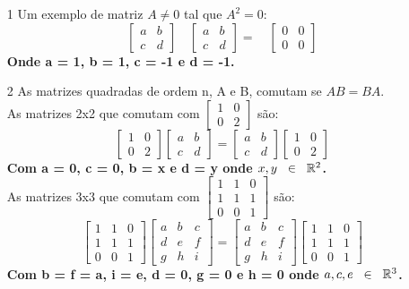 \documentclass[11pt]{article}
\begin{document}
\begin{itemize}
\item[1] Um exemplo de matriz $A \neq 0$ tal que $A^2=0$:
$$
\left[\begin{array}{rr}
a&b\\
c&d
\end{array}\right]
\quad
\left[\begin{array}{cc}
a&b\\
c&d
\end{array}\right]
=
\quad
\left[\begin{array}{cc}
0&0\\
0&0
\end{array}\right]
$$
\textbf{Onde a = 1, b = 1, c = -1 e d = -1.}
\item[2] As matrizes quadradas de ordem n, A e B, comutam se $AB = BA$. 
\\As matrizes 2x2 que comutam com $\left[\begin{array}{cc}
1&0\\0&2
\end{array}\right]$ são:
$$
\begin{bmatrix}
1&0\\0&2
\end{bmatrix}
\begin{bmatrix}
a&b\\c&d
\end{bmatrix}
=
\begin{bmatrix}
a&b\\c&d
\end{bmatrix}
\begin{bmatrix}
1&0\\0&2
\end{bmatrix}
$$
\textbf{Com a = 0, c = 0, b = x e d = y onde $x,y\hspace{2mm}\in\hspace{2mm}\mathbb{R}^2$.}
\\As matrizes 3x3 que comutam com 
$\begin{bmatrix}
1&1&0\\1&1&1\\0&0&1
\end{bmatrix}$ são:
$$
\begin{bmatrix}
1&1&0\\1&1&1\\0&0&1
\end{bmatrix}
\begin{bmatrix}
a&b&c\\d&e&f\\g&h&i
\end{bmatrix}
=
\begin{bmatrix}
a&b&c\\d&e&f\\g&h&i
\end{bmatrix}
\begin{bmatrix}
1&1&0\\1&1&1\\0&0&1
\end{bmatrix}
$$
\textbf{Com b = f = a, i = e, d = 0, g = 0 e h = 0 onde $a,c,e\hspace{2mm}\in\hspace{2mm}\mathbb{R}^3$.}


\end{itemize}
\end{document}
